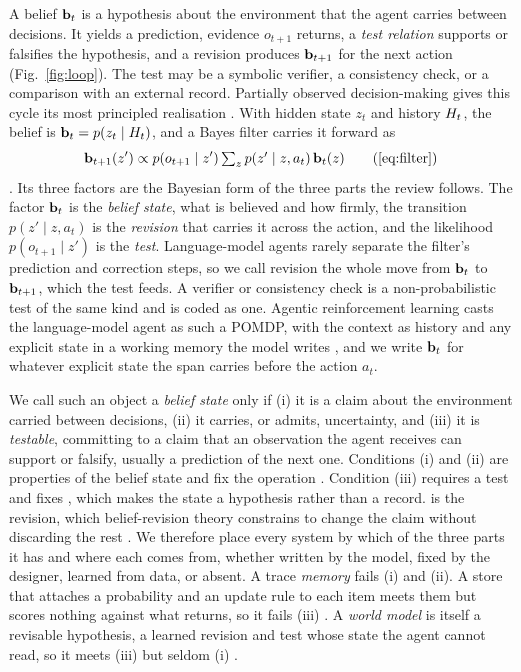 A belief $\mathbf{b}_t$ is a hypothesis about the environment that the agent carries between decisions. It yields a prediction, evidence $o_{t+1}$ returns, a \emph{test relation} supports or falsifies the hypothesis, and a revision produces $\mathbf{b}_{t+1}$ for the next action (Fig.~\ref{fig:loop}). The test may be a symbolic verifier, a consistency check, or a comparison with an external record. Partially observed decision-making gives this cycle its most principled realisation \citep{astrom1965optimal,kaelbling1998planning}. With hidden state $z_t$ and history $H_t$, the belief is $\mathbf{b}_t = p(z_t \mid H_t)$, and a Bayes filter carries it forward as
\begin{equation}
\belief_{t+1}(z') \propto p(o_{t+1} \mid z') \textstyle\sum_{z} p(z' \mid z, a_t)\, \belief_t(z)
\eqfilterlab
\end{equation}
\citep{thrun2005probabilistic}. Its three factors are the Bayesian form of the three parts the review follows. The factor $\mathbf{b}_t$ is the \emph{belief state}, what is believed and how firmly, the transition $p(z' \mid z, a_t)$ is the \emph{revision} that carries it across the action, and the likelihood $p(o_{t+1} \mid z')$ is the \emph{test}. Language-model agents rarely separate the filter's prediction and correction steps, so we call revision the whole move from $\mathbf{b}_t$ to $\mathbf{b}_{t+1}$, which the test feeds. A verifier or consistency check is a non-probabilistic test of the same kind and is coded as one. Agentic reinforcement learning casts the language-model agent as such a POMDP, with the context as history and any explicit state in a working memory the model writes \citep{zhang2025landscape,sumers2023cognitive,yao2023react}, and we write $\mathbf{b}_t$ for whatever explicit state the span carries before the action $a_t$.

We call such an object a \emph{belief state} only if (i) it is a claim about the environment carried between decisions, (ii) it carries, or admits, uncertainty, and (iii) it is \emph{testable}, committing to a claim that an observation the agent receives can support or falsify, usually a prediction of the next one. Conditions (i) and (ii) are properties of the belief state and fix the operation . Condition (iii) requires a test and fixes , which makes the state a hypothesis rather than a record.  is the revision, which belief-revision theory constrains to change the claim without discarding the rest \citep{alchourron1985logic,friston2010free}. We therefore place every system by which of the three parts it has and where each comes from, whether written by the model, fixed by the designer, learned from data, or absent. A trace \emph{memory} fails (i) and (ii). A store that attaches a probability and an update rule to each item meets them but scores nothing against what returns, so it fails (iii) \citep{luo2026storage}. A \emph{world model} is itself a revisable hypothesis, a learned revision and test whose state the agent cannot read, so it meets (iii) but seldom (i) \citep{li2026bridging}.
